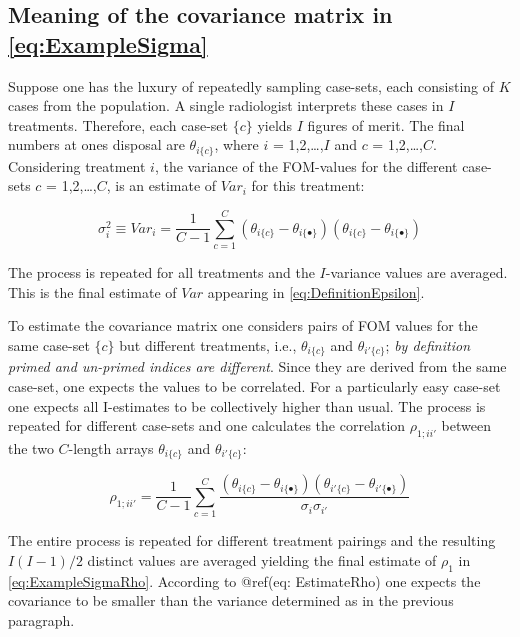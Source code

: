 \documentclass[
]{book}
\begin{document}
\hypertarget{meaning-of-the-covariance-matrix-in-refeqexamplesigma}{%
\subsection{Meaning of the covariance matrix in \eqref{eq:ExampleSigma}}\label{meaning-of-the-covariance-matrix-in-refeqexamplesigma}}

Suppose one has the luxury of repeatedly sampling case-sets, each consisting of \(K\) cases from the population. A single radiologist interprets these cases in \(I\) treatments. Therefore, each case-set \(\{c\}\) yields \(I\) figures of merit. The final numbers at ones disposal are \(\theta_{i\{c\}}\), where \(i\) = 1,2,\ldots,\(I\) and \(c\) = 1,2,\ldots,\(C\). Considering treatment \(i\), the variance of the FOM-values for the different case-sets \(c\) = 1,2,\ldots,\(C\), is an estimate of \(Var_i\) for this treatment:

\begin{equation}
\sigma_i^2 \equiv Var_i = \frac{1}{C-1}\sum_{c=1}^{C}\left ( \theta_{i\{c\}} - \theta_{i\{\bullet\}} \right) \left ( \theta_{i\{c\}} - \theta_{i\{\bullet\}} \right)
\label{eq:EstimateVari}
\end{equation}

The process is repeated for all treatments and the \(I\)-variance values are averaged. This is the final estimate of \(Var\) appearing in \eqref{eq:DefinitionEpsilon}.

To estimate the covariance matrix one considers pairs of FOM values for the same case-set \(\{c\}\) but different treatments, i.e., \(\theta_{i\{c\}}\) and \(\theta_{i'\{c\}}\); \emph{by definition primed and un-primed indices are different}. Since they are derived from the same case-set, one expects the values to be correlated. For a particularly easy case-set one expects all I-estimates to be collectively higher than usual. The process is repeated for different case-sets and one calculates the correlation \(\rho_{1;ii'}\) between the two \(C\)-length arrays \(\theta_{i\{c\}}\) and \(\theta_{i'\{c\}}\):

\begin{equation}
\rho_{1;ii'} = \frac{1}{C-1}\sum_{c=1}^{C} \frac {\left ( \theta_{i\{c\}} - \theta_{i\{\bullet\}} \right) \left ( \theta_{i'\{c\}} - \theta_{i'\{\bullet\}} \right)}{\sigma_i \sigma_{i'} }
\label{eq:EstimateRho}
\end{equation}

The entire process is repeated for different treatment pairings and the resulting \(I(I-1)/2\) distinct values are averaged yielding the final estimate of \(\rho_1\) in \eqref{eq:ExampleSigmaRho}. According to @ref(eq: EstimateRho) one expects the covariance to be smaller than the variance determined as in the previous paragraph.
\end{document}
